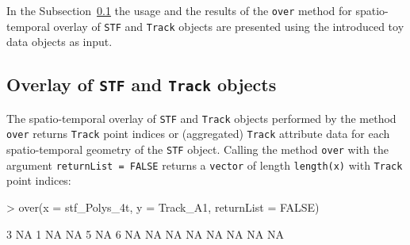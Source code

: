 \documentclass[12pt, oneside, a4paper]{scrbook}
\let\code=\texttt
\newcommand{\codeintitles}[1]{{\tt #1}} %
\begin{document}
\par\medskip

In the Subsection~\ref{subsec:overlayofstf} the usage and the results of the \code{over} method for spatio-temporal overlay of \code{STF} and \code{Track} objects are presented using the introduced toy data objects as input.


\subsection{Overlay of \codeintitles{STF} and \codeintitles{Track} objects}
\label{subsec:overlayofstf}

The spatio-temporal overlay of \code{STF} and \code{Track} objects performed by the method \code{over} returns \code{Track} point indices or (aggregated) \code{Track} attribute data for each spatio-temporal geometry of the \code{STF} object.
Calling the method \code{over} with the argument \code{returnList = FALSE} returns a \code{vector} of length \code{length(x)} with \code{Track} point indices:

\begin{small}
\begin{Schunk}
\begin{Sinput}
> over(x = stf_Polys_4t, y = Track_A1, returnList = FALSE)
\end{Sinput}
\begin{Soutput}
 [1]  3 NA  1 NA NA  5 NA  6 NA NA NA NA NA NA NA NA
\end{Soutput}
\end{Schunk}
\end{small}
\end{document}
